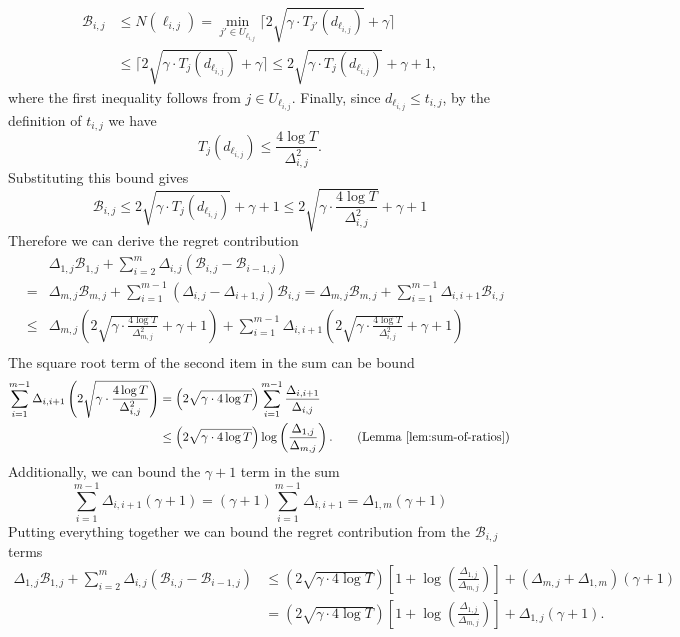 \documentclass[opre,blindrev]{informs3}
\begin{document}
\begin{APPENDICES}
    \begin{align*}
        \mathcal{B}_{i,j} 
        &\leq N(\ell_{i,j})  
        = \min_{j' \in U_{\ell_{i,j}}} \Big\lceil 2\sqrt{\gamma \cdot T_{j'}(d_{\ell_{i,j}})} + \gamma \Big\rceil \\
        &\leq \Big\lceil 2\sqrt{\gamma \cdot T_j(d_{\ell_{i,j}})} + \gamma \Big\rceil
        \leq 2\sqrt{\gamma \cdot T_j(d_{\ell_{i,j}})} + \gamma + 1,
    \end{align*}
    where the first inequality follows from $j \in U_{\ell_{i,j}}$. Finally, since \(d_{\ell_{i,j}} \leq t_{i,j}\), by the definition of \(t_{i,j}\) we have
    \[
        T_j(d_{\ell_{i,j}}) \leq \frac{4 \log T}{\Delta_{i,j}^2}.
    \]
    Substituting this bound gives
  $$  \mathcal{B}_{i,j}\leq 2\sqrt{\gamma \cdot T_j(d_{\ell_{i,j}})} + \gamma + 1
        \leq 2\sqrt{\gamma \cdot \frac{4\log T}{\Delta_{i,j}^2}} + \gamma + 1 $$
    Therefore we can derive the regret contribution
    \begin{eqnarray*}
       && \Delta_{1,j}\mathcal{B}_{1,j}+ \sum_{i=2}^m \Delta_{i,j}\left(\mathcal{B}_{i,j} -  \mathcal{B}_{i-1,j}\right)\\
       &=&\Delta_{m,j}\mathcal{B}_{m,j}+ \sum_{i=1}^{m-1} \left(\Delta_{i,j}-\Delta_{i+1,j}\right)\mathcal{B}_{i,j}
        =\Delta_{m,j}\mathcal{B}_{m,j}+ \sum_{i=1}^{m-1} \Delta_{i,i+1}\mathcal{B}_{i,j}\\
        &\leq& \Delta_{m,j}\left(2\sqrt{\gamma \cdot \frac{4\log T}{\Delta_{m,j}^2}} + \gamma + 1\right)+ \sum_{i=1}^{m-1} \Delta_{i,i+1}\left(2\sqrt{\gamma \cdot \frac{4\log T}{\Delta_{i,j}^2}} + \gamma + 1\right)\\
    \end{eqnarray*}
    The square root term of the second item in the sum can be bound
    \begin{align*}
        \sum_{i=1}^{m-1} \Delta_{i,i+1}\left(2\sqrt{\gamma \cdot \frac{4\log T}{\Delta_{i,j}^2}}\right)
        &= \left(2\sqrt{\gamma \cdot 4\log T}\right)\sum_{i=1}^{m-1} \frac{\Delta_{i,i+1}}{\Delta_{i,j}}\\
        &\leq\left(2\sqrt{\gamma \cdot 4\log T}\right)\log\left(\frac{\Delta_{1,j}}{\Delta_{m,j}}\right). \tag{Lemma \ref{lem:sum-of-ratios}}
    \end{align*}
    Additionally, we can bound the \(\gamma + 1\) term in the sum
    \[\sum_{i=1}^{m-1} \Delta_{i,i+1}(\gamma + 1)=(\gamma+1)\sum_{i=1}^{m-1} \Delta_{i,i+1}=\Delta_{1,m}(\gamma+1)\]
    Putting everything together we can bound the regret contribution from the \(\mathcal{B}_{i,j}\) terms
    \begin{align*}
        \Delta_{1,j}\mathcal{B}_{1,j}+ \sum_{i=2}^m \Delta_{i,j}\left(\mathcal{B}_{i,j} -  \mathcal{B}_{i-1,j}\right)&\leq \left(2\sqrt{\gamma \cdot 4\log T}\right)\left[1+\log\left(\frac{\Delta_{1,j}}{\Delta_{m,j}}\right)\right] +(\Delta_{m,j}+\Delta_{1,m})(\gamma + 1)\\
        &= \left(2\sqrt{\gamma \cdot 4\log T}\right)\left[1+\log\left(\frac{\Delta_{1,j}}{\Delta_{m,j}}\right)\right] + \Delta_{1,j}(\gamma + 1).
    \end{align*}
    

\end{APPENDICES}
\end{document}
